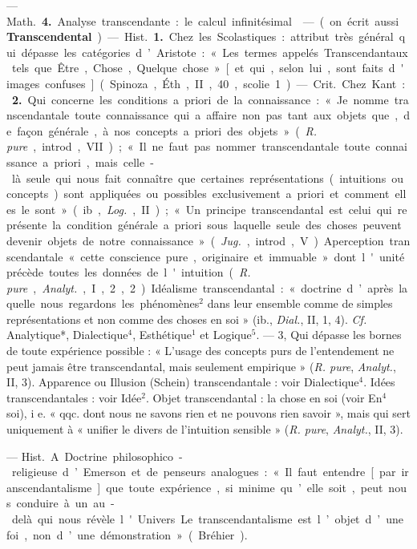 \begin{itemize}[leftmargin=1cm, label=, itemsep=1pt]
— \si{Math.} {\bf 4.} Analyse transcendante : le calcul infinitésimal.

 — (on écrit aussi {\bf Transcendental}) — \si{Hist.} {\bf 1.} Chez les Scolastiques : attribut très général qui
dépasse les catégories d’Aristote :
« Les termes appelés Transcendantaux tels que Être, Chose, Quelque
chose » [et qui, selon lui, sont faits
d'images confuses] (Spinoza, Éth.,
II, 40, scolie 1).

— \si{Crit.} Chez Kant : {\bf 2.} Qui concerne les conditions a priori de la
connaissance : « Je nomme transcendantale toute connaissance qui a
affaire non pas tant aux objets que,
de façon générale, à nos concepts a
priori des objets » ({\it R. pure}, introd.,
VII) ; « Il ne faut pas nommer transcendantale toute connaissance a priori, mais celle-là seule qui nous
fait connaître que certaines représentations (intuitions ou concepts)
sont appliquées ou possibles exclusivement a priori et comment elles
le sont » (ib., {\it Log.}, II) ; « Un principe transcendantal est celui qui
représente la condition générale
a priori sous laquelle seule des
choses peuvent devenir objets de
notre connaissance » ({\it Jug.}, introd.,
V). Aperception transcendantale
« cette conscience pure, originaire et
immuable » dont l'unité précède
toutes les données de l'intuition
({\it R. pure}, {\it Analyt.}, I, 2, 2). Idéalisme transcendantal : « doctrine
d’après laquelle nous regardons les
phénomènes$^2$ dans leur ensemble
comme de simples représentations
et non comme des choses en soi »
(ib., {\it Dial.}, II, 1, 4). {\it Cf.} Analytique*,
Dialectique$^4$, Esthétique$^1$ et Logique$^5$.
— 3, Qui dépasse les bornes de
toute expérience possible : « L'usage
des concepts purs de l’entendement
ne peut jamais être transcendantal,
mais seulement empirique » ({\it R. pure},
{\it Analyt.}, II, 3). Apparence ou Illusion (Schein) transcendantale : voir
Dialectique$^4$. Idées transcendantales :
voir Idée$^2$. Objet transcendantal : la
chose en soi (voir En$^4$ soi), i e.
« qqc. dont nous ne savons rien et
ne pouvons rien savoir », mais qui
sert uniquement à « unifier le divers
de l'intuition sensible » ({\it R. pure},
{\it Analyt.}, II, 3).

 — \si{Hist.} A. Doctrine philosophico-religieuse d’Emerson et de penseurs analogues : « Il
faut entendre [par iranscendantalisme] que toute expérience, si minime qu’elle soit, peut nous conduire
à un au-delà qui nous révèle l'Univers... Le transcendantalisme est
l’objet d’une foi, non d’une démonstration » (Bréhier).


\end{itemize}
